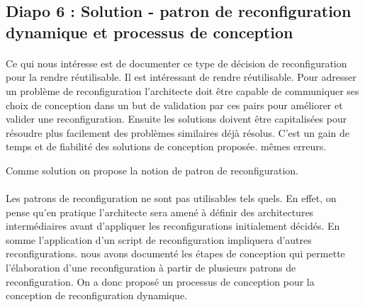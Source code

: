 \subsection{Diapo 6 : Solution - patron de reconfiguration dynamique
et processus de conception}

\paragraph{}
Ce qui nous intéresse est de documenter ce type de décision de
reconfiguration pour la rendre réutilisable. 
%
Il est intéressant de rendre réutilisable. 
Pour adresser un problème de reconfiguration l'architecte doit être
capable de communiquer ses choix de conception dans un but de
validation par ces pairs pour améliorer et valider une
reconfiguration. Ensuite les solutions doivent être capitalisées pour
résoudre plus facilement des problèmes similaires déjà résolus. C'est
un gain de temps et de fiabilité des solutions de conception proposée. 
mêmes erreurs. 

Comme solution on propose la notion de patron de
reconfiguration.

\paragraph{}
Les patrons de reconfiguration ne sont pas utilisables tels quels.
En effet, on pense qu'en pratique l'architecte sera amené à définir
des architectures intermédiaires avant d'appliquer les
reconfigurations initialement décidés. En somme l'application d'un
script de reconfiguration impliquera d'autres reconfigurations. 
% 
nous avons documenté les étapes de conception qui permette
l'élaboration d'une reconfiguration à partir de plusieurs patrons de
reconfiguration. On a donc proposé un processus de conception pour la
conception de reconfiguration dynamique. 
 


